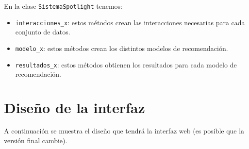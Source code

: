 En la clase \texttt{SistemaSpotlight} tenemos:
\begin{itemize}
\tightlist
\item \texttt{interacciones\_x}: estos métodos crean las interacciones necesarias para cada conjunto de datos. 
\item \texttt{modelo\_x}: estos métodos crean los distintos modelos de recomendación. 
\item \texttt{resultados\_x}: estos métodos obtienen los resultados para cada modelo de recomendación. 
\end{itemize}

\section{Diseño de la interfaz}\label{diseño-gui}
A continuación se muestra el diseño que tendrá la interfaz web (es posible que la versión final cambie).

\begin{landscape}
\end{landscape} 
